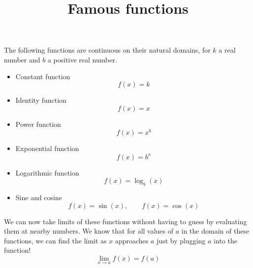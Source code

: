 \documentclass{ximera}
\title{Famous functions}
\begin{document}
\begin{abstract}
\end{abstract}

\maketitle

\begin{theorem}
    The following functions are continuous on their natural domains, for $k$ a real number and $b$ a positive real number.
    \begin{itemize}
        \item Constant function \[f(x)=k\]
        \item Identity function \[f(x)=x\]
        \item Power function \[f(x)=x^b\]
        \item Exponential function \[f(x)=b^x\]
        \item Logarithmic function \[f(x)=\log_b(x)\]
        \item Sine and cosine \[f(x)=\sin(x), \qquad f(x) = \cos(x)\]
    \end{itemize}
\end{theorem}

We can now take limits of these functions without having to guess by evaluating them at nearby numbers. We know that for all values of $a$ in the domain of these functions, we can find the limit as $x$ approaches $a$ just by plugging $a$ into the function!
\[
    \lim_{x \to a} f(x) = f(a)
\]
\end{document}
